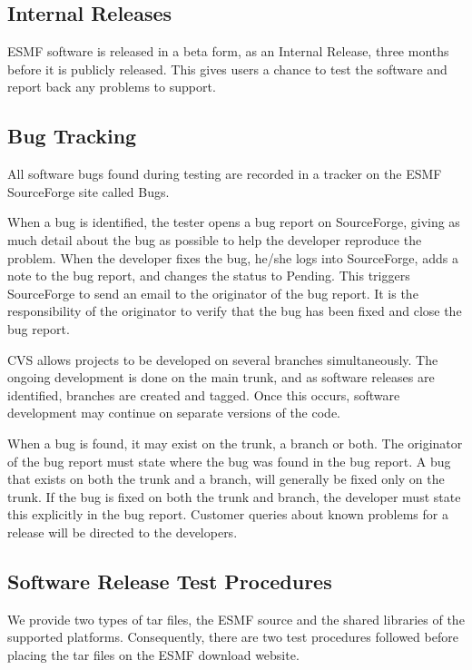 \subsection{Internal Releases}

ESMF software is released in a beta form, as an Internal Release,
three months before it is publicly released.  This gives users
a chance to test the software and report back any problems to 
support.

\subsection{Bug Tracking}

All software bugs found during testing are recorded
in a tracker on the ESMF SourceForge site called Bugs.

When a bug is identified, the tester opens a bug report on SourceForge, giving as much detail
about the bug as possible to help the developer reproduce the problem. When the developer
fixes the bug, he/she logs into SourceForge, adds a note to the bug report, and changes the status
to Pending. This triggers SourceForge to send an email to the originator of the bug report. It is
the responsibility of the originator to verify that the bug has been fixed and close the bug report.

CVS allows projects to be developed on several branches simultaneously. The ongoing development
is done on the main trunk, and as software releases are identified, branches are created and tagged. Once this
occurs, software development may continue on separate versions of the code. 

When a bug is found, it may exist on the trunk, a branch or both. The originator of the bug report
must state where the bug was found in the bug report.  A bug that exists on both the trunk and a 
branch, will generally be fixed only on the trunk. If the bug is fixed on both the trunk and branch, the 
developer must state this explicitly in the bug report.  Customer queries about known problems for a 
release will be directed to the developers.

\subsection{Software Release Test Procedures}

We provide two types of tar files, the ESMF source and the shared libraries of 
the supported platforms. Consequently, there are two test procedures followed before placing the 
tar files on the ESMF download website. 

